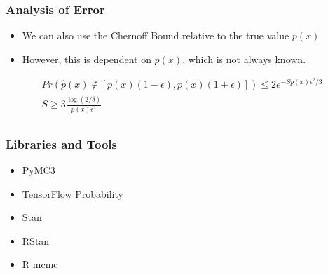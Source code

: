\documentclass{beamer}
\begin{document}
\begin{frame}
  \frametitle{Analysis of Error}
  \begin{itemize}
    \item We can also use the Chernoff Bound relative to the true value $p(x)$
    \item However, this is dependent on $p(x)$, which is not always known.
  \end{itemize}
  \begin{gather*}
    Pr \left( \hat{p}(x) \not\in \left[p(x)(1 - \epsilon), p(x)(1 + \epsilon) \right] \right) \leq 2 e^{-S p(x) \epsilon^2 / 3} \\
    S \geq 3 \frac{\log \left(2 / \delta \right)}{p(x) \epsilon^2} \\
  \end{gather*}
\end{frame}



\begin{frame}
  \frametitle{Libraries and Tools}
  \begin{itemize}
    \item \href{https://pymc-devs.github.io/pymc3/}{PyMC3}
    \item \href{https://www.tensorflow.org/probability/}{TensorFlow Probability}
    \item \href{http://mc-stan.org}{Stan}
    \item \href{https://mc-stan.org/users/interfaces/rstan}{RStan}
    \item \href{https://cran.r-project.org/web/packages/mcmc/index.html}{R mcmc}
  \end{itemize}
\end{frame}
\end{document}
